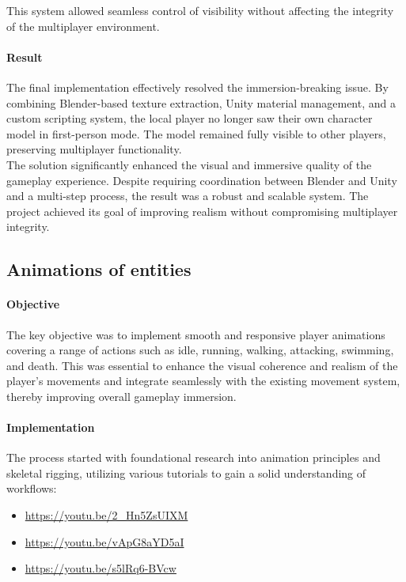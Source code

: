 \documentclass{article}
\begin{document}
This system allowed seamless control of visibility without affecting the integrity of the multiplayer environment.

\paragraph{Result}\hfill

The final implementation effectively resolved the immersion-breaking issue. By combining Blender-based texture extraction, Unity material management, and a custom scripting system, the local player no longer saw their own character model in first-person mode. The model remained fully visible to other players, preserving multiplayer functionality.\\

The solution significantly enhanced the visual and immersive quality of the gameplay experience. Despite requiring coordination between Blender and Unity and a multi-step process, the result was a robust and scalable system. The project achieved its goal of improving realism without compromising multiplayer integrity.










\newpage
\subsection{Animations of entities}
\paragraph{Objective}\hfill

The key objective was to implement smooth and responsive player animations covering a range of actions such as idle, running, walking, attacking, swimming, and death. This was essential to enhance the visual coherence and realism of the player's movements and integrate seamlessly with the existing movement system, thereby improving overall gameplay immersion.

\paragraph{Implementation}\hfill

The process started with foundational research into animation principles and skeletal rigging, utilizing various tutorials to gain a solid understanding of workflows:
\begin{itemize}
    \item \url{https://youtu.be/2_Hn5ZsUIXM} 
    \item \url{https://youtu.be/vApG8aYD5aI} 
    \item \url{https://youtu.be/s5lRq6-BVcw} 
\end{itemize}
\end{document}

